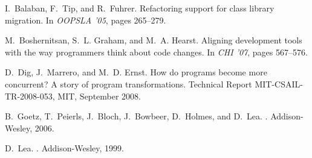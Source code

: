 \documentclass[10pt,preprint]{sigplanconf}
\begin{document}

%
\begin{thebibliography}{10}
I.~Balaban, F.~Tip, and R.~Fuhrer.
\newblock Refactoring support for class library migration.
\newblock In {\em OOPSLA '05}, pages 265--279. 

M.~Boshernitsan, S.~L. Graham, and M.~A. Hearst.
\newblock Aligning development tools with the way programmers think about code
  changes.
\newblock In {\em CHI '07}, pages 567--576. 

D.~Dig, J.~Marrero, and M.~D. Ernst.
\newblock How do programs become more concurrent? {A} story of program
  transformations.
\newblock Technical Report MIT-CSAIL-TR-2008-053, MIT, September 2008.

B.~Goetz, T.~Peierls, J.~Bloch, J.~Bowbeer, D.~Holmes, and D.~Lea.
.
\newblock Addison-Wesley, 2006.

D.~Lea.
.
\newblock Addison-Wesley, 1999.
\end{thebibliography}
\end{document}
